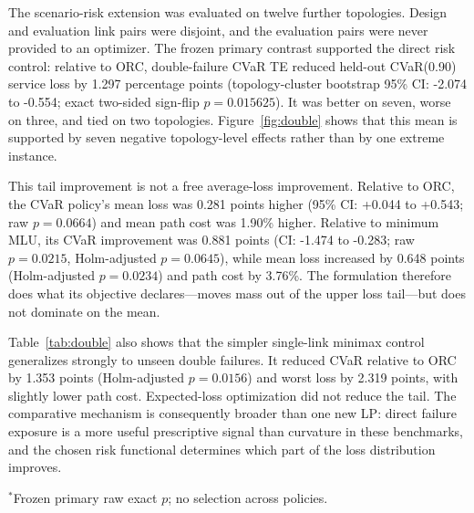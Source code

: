 \documentclass[preprint,12pt]{elsarticle}
\begin{document}
The scenario-risk extension was evaluated on twelve further topologies. Design
and evaluation link pairs were disjoint, and the evaluation pairs were never
provided to an optimizer. The frozen primary contrast supported the direct
risk control: relative to ORC, double-failure CVaR TE reduced held-out
CVaR(0.90) service loss by 1.297 percentage points (topology-cluster bootstrap
95\% CI: -2.074 to -0.554; exact two-sided sign-flip $p=0.015625$). It was
better on seven, worse on three, and tied on two topologies.
Figure~\ref{fig:double} shows that this mean is supported by seven negative
topology-level effects rather than by one extreme instance.

This tail improvement is not a free average-loss improvement. Relative to ORC,
the CVaR policy's mean loss was 0.281 points higher (95\% CI: +0.044 to +0.543;
raw $p=0.0664$) and mean path cost was 1.90\% higher. Relative to minimum MLU,
its CVaR improvement was 0.881 points (CI: -1.474 to -0.283; raw $p=0.0215$,
Holm-adjusted $p=0.0645$), while mean loss increased by 0.648 points
(Holm-adjusted $p=0.0234$) and path cost by 3.76\%. The formulation therefore
does what its objective declares---moves mass out of the upper loss tail---but
does not dominate on the mean.

Table~\ref{tab:double} also shows that the simpler single-link minimax control
generalizes strongly to unseen double failures. It reduced CVaR relative to ORC
by 1.353 points (Holm-adjusted $p=0.0156$) and worst loss by 2.319 points, with
slightly lower path cost. Expected-loss optimization did not reduce the tail.
The comparative mechanism is consequently broader than one new LP: direct
failure exposure is a more useful prescriptive signal than curvature in these
benchmarks, and the chosen risk functional determines which part of the loss
distribution improves.

\begin{table}[t]
\centering
\caption{Held-out double-link-failure effects relative to ORC over twelve new
topologies. Negative values favor the candidate. CVaR intervals resample
topologies. The double-CVaR comparison is the frozen primary test and uses its
raw exact $p$; other adjusted values use Holm correction within the CVaR
secondary family.}
\label{tab:double}
\small
{}

\footnotesize $^{*}$Frozen primary raw exact $p$; no selection across policies.
\end{table}
\end{document}

